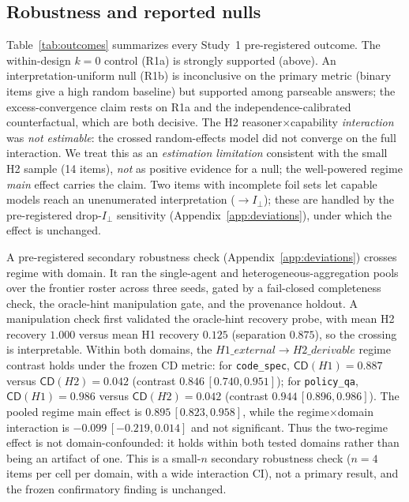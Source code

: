 \documentclass[acmsmall,screen,nonacm]{acmart}
\newcommand{\cd}{\textsf{CD}}
\newcommand{\iperp}{\ensuremath{I_\perp}}
\begin{document}
\subsection{Robustness and reported nulls}
\label{sec:robust}
Table~\ref{tab:outcomes} summarizes every Study~1 pre-registered outcome. The within-design $k{=}0$ control (R1a) is
strongly supported (above). An interpretation-uniform null (R1b)
is inconclusive on the primary metric (binary items give a high random baseline) but supported among
parseable answers; the excess-convergence claim rests on R1a and the independence-calibrated counterfactual,
which are both decisive. The H2 reasoner$\times$capability \emph{interaction} was \emph{not estimable}: the
crossed random-effects model did not converge on the full interaction. We treat this as an
\emph{estimation limitation} consistent with the small H2 sample (14 items), \emph{not} as positive evidence
for a null; the well-powered regime \emph{main} effect carries the claim. Two items with incomplete foil sets let
capable models reach an unenumerated interpretation ($\rightarrow\iperp$); these are handled by the
pre-registered drop-\iperp{} sensitivity (Appendix~\ref{app:deviations}), under which the effect is
unchanged.

A pre-registered secondary robustness check (Appendix~\ref{app:deviations}) crosses regime with domain. It ran the
single-agent and heterogeneous-aggregation pools over the frontier roster across three seeds, gated by a fail-closed
completeness check, the oracle-hint manipulation gate, and the provenance holdout. A
manipulation check first validated the oracle-hint recovery probe, with mean H2 recovery $1.000$ versus mean
H1 recovery $0.125$ (separation $0.875$), so the crossing is interpretable. Within both domains, the
$H1\_external \rightarrow H2\_derivable$ regime contrast holds under the frozen \cd{} metric:
for \texttt{code\_spec}, $\cd(H1)=0.887$ versus $\cd(H2)=0.042$ (contrast $0.846\,[0.740,0.951]$); for
\texttt{policy\_qa}, $\cd(H1)=0.986$ versus $\cd(H2)=0.042$ (contrast $0.944\,[0.896,0.986]$). The pooled
regime main effect is $0.895\,[0.823,0.958]$, while the regime$\times$domain interaction is
$-0.099\,[-0.219,0.014]$ and not significant. Thus the two-regime effect is not domain-confounded: it holds
within both tested domains rather than being an artifact of one. This is a small-$n$ secondary robustness
check ($n=4$ items per cell per domain, with a wide interaction CI), not a primary result, and the frozen
confirmatory finding is unchanged.
\end{document}
